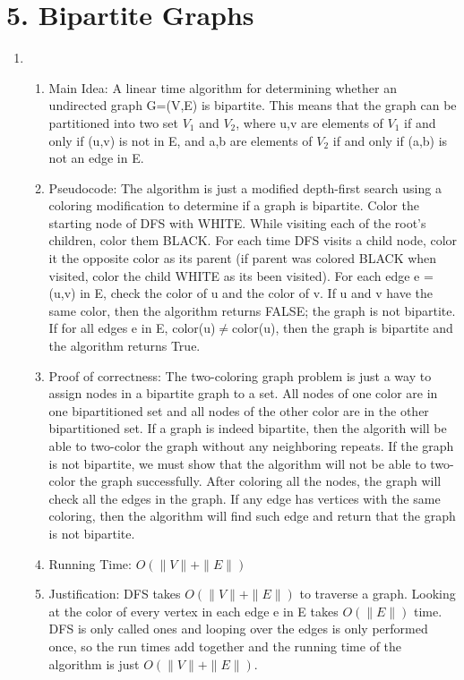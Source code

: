 \documentclass[11pt]{article}
\newenvironment{qparts}{\begin{enumerate}[{(}a{)}]}{\end{enumerate}}
\begin{document}
\newpage
\section*{5. Bipartite Graphs}
\begin{qparts}
\item \begin{enumerate}
\item Main Idea: A linear time algorithm for determining whether an undirected graph G=(V,E) is bipartite. This means that the graph can be partitioned into two set $V_1$ and $V_2$, where u,v are elements of $V_1$ if and only if (u,v) is not in E, and a,b are elements of $V_2$ if and only if (a,b) is not an edge in E.
\item Pseudocode: The algorithm is just a modified depth-first search using a coloring modification to determine if a graph is bipartite. Color the starting node of DFS with WHITE. While visiting each of the root's children, color them BLACK. For each time DFS visits a child node, color it the opposite color as its parent (if parent was colored BLACK when visited, color the child WHITE as its been visited). For each edge e = (u,v) in E, check the color of u and the color of v. If u and v have the same color, then the algorithm returns FALSE; the graph is not bipartite. If for all edges e in E, color(u)$\neq$color(u), then the graph is bipartite and the algorithm returns True.
\item Proof of correctness: The two-coloring graph problem is just a way to assign nodes in a bipartite graph to a set. All nodes of one color are in one bipartitioned set and all nodes of the other color are in the other bipartitioned set. If a graph is indeed bipartite, then the algorith will be able to two-color the graph without any neighboring repeats. If the graph is not bipartite, we must show that the algorithm will not be able to two-color the graph successfully. After coloring all the nodes, the graph will check all the edges in the graph. If any edge has vertices with the same coloring, then the algorithm will find such edge and return that the graph is not bipartite. 
\item Running Time: $O(\|V\|+\|E\|)$
\item Justification: DFS takes $O(\|V\|+\|E\|)$ to traverse a graph. Looking at the color of every vertex in each edge e in E takes $O(\|E\|)$ time. DFS is only called ones and looping over the edges is only performed once, so the run times add together and the running time of the algorithm is just $O(\|V\|+\|E\|)$.

\end{enumerate}
\end{qparts}
\end{document}
